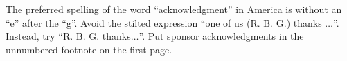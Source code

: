 \documentclass[conference]{IEEEtran}
\begin{document}
The preferred spelling of the word ``acknowledgment'' in America is without 
an ``e'' after the ``g''. Avoid the stilted expression ``one of us (R. B. 
G.) thanks $\ldots$''. Instead, try ``R. B. G. thanks$\ldots$''. Put sponsor 
acknowledgments in the unnumbered footnote on the first page. \cite{aazam_offloading_2018}










\end{document}

